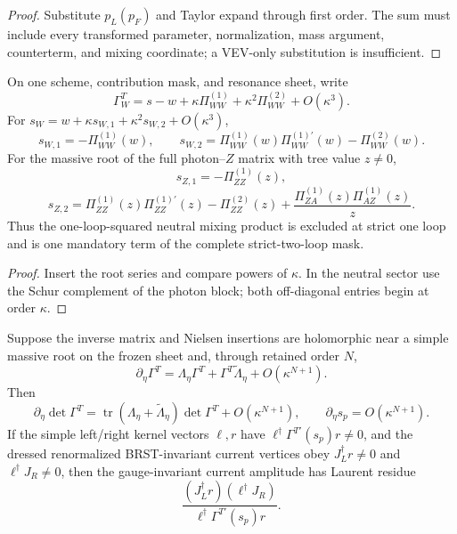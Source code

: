 \begin{proof}
Substitute \(p_L(p_F)\) and Taylor expand through first order. The sum must
include every transformed parameter, normalization, mass argument,
counterterm, and mixing coordinate; a VEV-only substitution is insufficient.
\end{proof}

\begin{theorem}
\label{thm:qft-q3-strict-wz-coefficients}
On one scheme, contribution mask, and resonance sheet, write
\[
\Gamma_W^T=s-w+\kappa\Pi_{WW}^{(1)}
+\kappa^2\Pi_{WW}^{(2)}+O(\kappa^3).
\]
For \(s_W=w+\kappa s_{W,1}+\kappa^2s_{W,2}+O(\kappa^3)\),
\[
s_{W,1}=-\Pi_{WW}^{(1)}(w),\qquad
s_{W,2}=\Pi_{WW}^{(1)}(w)\Pi_{WW}^{(1)\prime}(w)
-\Pi_{WW}^{(2)}(w).
\]
For the massive root of the full photon--\(Z\) matrix with tree value
\(z\ne0\),
\[
s_{Z,1}=-\Pi_{ZZ}^{(1)}(z),
\]
\[
s_{Z,2}=\Pi_{ZZ}^{(1)}(z)\Pi_{ZZ}^{(1)\prime}(z)
-\Pi_{ZZ}^{(2)}(z)
+\frac{\Pi_{ZA}^{(1)}(z)\Pi_{AZ}^{(1)}(z)}{z}.
\]
Thus the one-loop-squared neutral mixing product is excluded at strict one
loop and is one mandatory term of the complete strict-two-loop mask.
\end{theorem}

\begin{proof}
Insert the root series and compare powers of \(\kappa\). In the neutral
sector use the Schur complement of the photon block; both off-diagonal
entries begin at order \(\kappa\).
\end{proof}

\begin{theorem}
\label{thm:qft-q3-nielsen-current-pole}
Suppose the inverse matrix and Nielsen insertions are holomorphic near a
simple massive root on the frozen sheet and, through retained order \(N\),
\[
\partial_\eta\Gamma^T
=\Lambda_\eta\Gamma^T+\Gamma^T\widetilde\Lambda_\eta
+O(\kappa^{N+1}).
\]
Then
\[
\partial_\eta\det\Gamma^T
=\operatorname{tr}(\Lambda_\eta+\widetilde\Lambda_\eta)
\det\Gamma^T+O(\kappa^{N+1}),
\qquad
\partial_\eta s_p=O(\kappa^{N+1}).
\]
If the simple left/right kernel vectors \(\ell,r\) have
\(\ell^\dagger\Gamma^{T\prime}(s_p)r\ne0\), and the dressed renormalized
BRST-invariant current vertices obey
\(J_L^\dagger r\ne0\) and \(\ell^\dagger J_R\ne0\), then the
gauge-invariant current amplitude has Laurent residue
\[
\frac{(J_L^\dagger r)(\ell^\dagger J_R)}
{\ell^\dagger\Gamma^{T\prime}(s_p)r}.
\]
\end{theorem}

